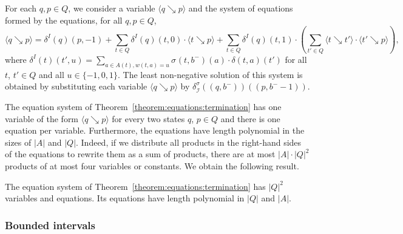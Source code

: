 \documentclass[a4paper,UKenglish,cleveref,autoref,thm-restate,colorlinks]{lipics-v2021}
\newcommand{\mdpTrans}{\delta}
\newcommand{\weight}{w}
\newcommand{\weightVal}{u}
\newcommand{\ocStateSpace}{Q}
\newcommand{\ocState}{q}
\newcommand{\ocStateB}{p}
\newcommand{\ocStateC}{t}
\newcommand{\ocActionSpace}{A}
\newcommand{\ocAction}{a}
\newcommand{\ocTrans}{\delta}
\newcommand{\intPart}{\mathcal{I}}
\newcommand{\interval}{I}
\newcommand{\intBound}{b}
\newcommand{\intLB}{\intBound^-}
\newcommand{\compressChainTransTemplate}[2]{\mdpTrans^{#1}_{#2}}
\newcommand{\compressChainTrans}{\compressChainTransTemplate{\strat}{\intPart}}
\newcommand{\termProbaVar}[2]{\langle#1\searrow{}#2\rangle}
\newcommand{\stratGeneric}[1]{{\sigma_{#1}}}
\newcommand{\strat}{\stratGeneric{}}
\begin{document}
\begin{theorem}\label{theorem:equations:termination}
  For each $\ocState, \ocStateB\in\ocStateSpace$, we consider a variable $\termProbaVar{\ocState}{\ocStateB}$ and the system of equations formed by the equations, for all $\ocState, \ocStateB\in\ocStateSpace$,
  \[\termProbaVar{\ocState}{\ocStateB} =
    \ocTrans^\interval(\ocState)(\ocStateB, -1) +
    \sum_{\ocStateC\in\ocStateSpace} \ocTrans^\interval(\ocState)(\ocStateC, 0)\cdot\termProbaVar{\ocStateC}{\ocStateB} +
    \sum_{\ocStateC\in\ocStateSpace} \ocTrans^\interval(\ocState)(\ocStateC, 1)\cdot
    \left(\sum_{\ocStateC'\in\ocStateSpace}\termProbaVar{\ocStateC}{\ocStateC'}\cdot\termProbaVar{\ocStateC'}{\ocStateB}\right),
  \]
  where $\ocTrans^\interval(\ocStateC)(\ocStateC', \weightVal) = \sum_{\ocAction\in\ocActionSpace(\ocStateC), \weight(\ocStateC, \ocAction)=\weightVal}\strat(\ocStateC, \intLB)(\ocAction)\cdot\ocTrans(\ocStateC, \ocAction)(\ocStateC')$ for all $\ocStateC$, $\ocStateC'\in\ocStateSpace$ and all $\weightVal\in\{-1, 0, 1\}$.
  The least non-negative solution of this system is obtained by substituting each variable $\termProbaVar{\ocState}{\ocStateB}$ by  $\compressChainTrans((\ocState, \intLB))((\ocStateB, \intLB-1))$.
\end{theorem}

The equation system of Theorem~\ref{theorem:equations:termination} has one variable of the form $\termProbaVar{\ocState}{\ocStateB}$ for every two states $\ocState$, $\ocStateB\in\ocStateSpace$ and there is one equation per variable.
Furthermore, the equations have length polynomial in the sizes of $|\ocActionSpace|$ and $|\ocStateSpace|$.
Indeed, if we distribute all products in the right-hand sides of the equations to rewrite them as a sum of products, there are at most $|\ocActionSpace|\cdot|\ocStateSpace|^2$ products of at most four variables or constants.
We obtain the following result.

\begin{lemma}\label{lemma:equations:termination:size}
  The equation system of Theorem~\ref{theorem:equations:termination} has $|\ocStateSpace|^2$ variables and equations.
  Its equations have length polynomial in $|\ocStateSpace|$ and $|\ocActionSpace|$.
\end{lemma}


\subsubsection{Bounded intervals}\label{section:abstraction:transitions:bounded}
\end{document}
